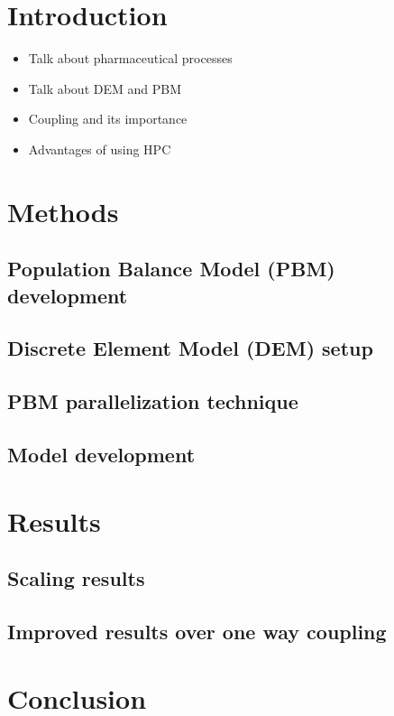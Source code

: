 \documentclass[fleqn,twoside,10pt]{article}
\begin{document}

\section{Introduction}
\begin{itemize}
\item Talk about pharmaceutical processes
\item Talk about DEM and PBM
\item Coupling and its importance
\item Advantages of using HPC
\end{itemize}

\section{Methods}


\subsection{Population Balance Model (PBM) development}
\subsection{Discrete Element Model (DEM) setup}
\subsection{PBM parallelization technique}
\subsection{Model development}
\section{Results}
\subsection{Scaling results}
\subsection{Improved results over one way coupling}
\section{Conclusion}



\end{document}
